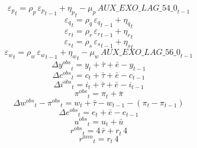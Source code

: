 \begin{dmath}
{{\varepsilon_p}}_{t}={{\rho_p}}\, {{\varepsilon_p}}_{t-1}+{{\eta_p}}_{t}-{{\mu_p}}\, {AUX\_EXO\_LAG\_54\_0}_{t-1}
\end{dmath}
\begin{dmath}
{{\varepsilon_q}}_{t}={{\rho_q}}\, {{\varepsilon_q}}_{t-1}+{{\eta_q}}_{t}
\end{dmath}
\begin{dmath}
{{\varepsilon_r}}_{t}={{\rho_r}}\, {{\varepsilon_r}}_{t-1}+{{\eta_r}}_{t}
\end{dmath}
\begin{dmath}
{{\varepsilon_s}}_{t}={{\rho_s}}\, {{\varepsilon_s}}_{t-1}+{{\eta_s}}_{t}
\end{dmath}
\begin{dmath}
{{\varepsilon_w}}_{t}={{\rho_w}}\, {{\varepsilon_w}}_{t-1}+{{\eta_w}}_{t}-{{\mu_w}}\, {AUX\_EXO\_LAG\_56\_0}_{t-1}
\end{dmath}
\begin{dmath}
{{\Delta y^{obs}}}_{t}={{y}}_{t}+{{\bar{\tau}}}+{{\bar{e}}}-{{y}}_{t-1}
\end{dmath}
\begin{dmath}
{{\Delta c^{obs}}}_{t}={{c}}_{t}+{{\bar{\tau}}}+{{\bar{e}}}-{{c}}_{t-1}
\end{dmath}
\begin{dmath}
{{\Delta i^{obs}}}_{t}={{i}}_{t}+{{\bar{\tau}}}+{{\bar{e}}}-{{i}}_{t-1}
\end{dmath}
\begin{dmath}
{{\pi^{obs}}}_{t}={{\pi}}_{t}+{{\bar{\pi}}}
\end{dmath}
\begin{dmath}
{{\Delta w^{obs}}}_{t}-{{\pi^{obs}}}_{t}={{w}}_{t}+{{\bar{\tau}}}-{{w}}_{t-1}-\left({{\pi}}_{t}-{{\pi}}_{t-1}\right)
\end{dmath}
\begin{dmath}
{{\Delta e^{obs}}}_{t}={{e}}_{t}+{{\bar{e}}}-{{e}}_{t-1}
\end{dmath}
\begin{dmath}
{{u^{obs}}}_{t}={{u}}_{t}+{{\bar{u}}}
\end{dmath}
\begin{dmath}
{{r^{obs}}}_{t}=4\, {{\bar{r}}}+{{r}}_{t}\, 4
\end{dmath}
\begin{dmath}
{{r^{ann}}}_{t}={{r}}_{t}\, 4
\end{dmath}
